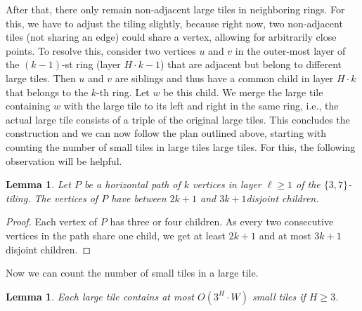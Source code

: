 \documentclass[11pt]{article}
\newtheorem{lemma}[theorem]{Lemma}
\begin{document}
%
After that, there only remain non-adjacent large tiles in neighboring rings.
For this, we have to adjust the tiling slightly, because right now, two non-adjacent tiles (not sharing an edge) could share a vertex, allowing for arbitrarily close points.
To resolve this, consider two vertices $u$ and $v$ in the outer-most layer of the $(k - 1)$-st ring (layer $H \cdot k - 1$) that are adjacent but belong to different large tiles.
Then $u$ and $v$ are siblings and thus have a common child in layer $H \cdot k$ that belongs to the $k$-th ring.
Let $w$ be this child.
We merge the large tile containing $w$ with the large tile to its left and right in the same ring, i.e., the actual large tile consists of a triple of the original large tiles.
%
This concludes the construction and we can now follow the plan outlined above, starting with counting the number of small tiles in large tiles large tiles.
For this, the following observation will be helpful.
%
\begin{lemma}
    \label{lem:3_7_tiling_exponential_growth}
    Let $P$ be a horizontal path of $k$ vertices in layer $\ell \ge 1$ of the $\{3, 7\}$-tiling.
    The vertices of $P$ have between $2k + 1$ and $3k + 1$disjoint children.
\end{lemma}
\begin{proof}
    Each vertex of $P$ has three or four children.
    As every two consecutive vertices in the path share one child, we get at least $2k + 1$ and at most $3k + 1$ disjoint children.
\end{proof}
%
Now we can count the number of small tiles in a large tile.
%
\begin{lemma}
    \label{lem:tiling_large_r_count_small_tiles}
    Each large tile contains at most $O(3^H \cdot W)$ small tiles if $H \ge 3$.
\end{lemma}
\end{document}
